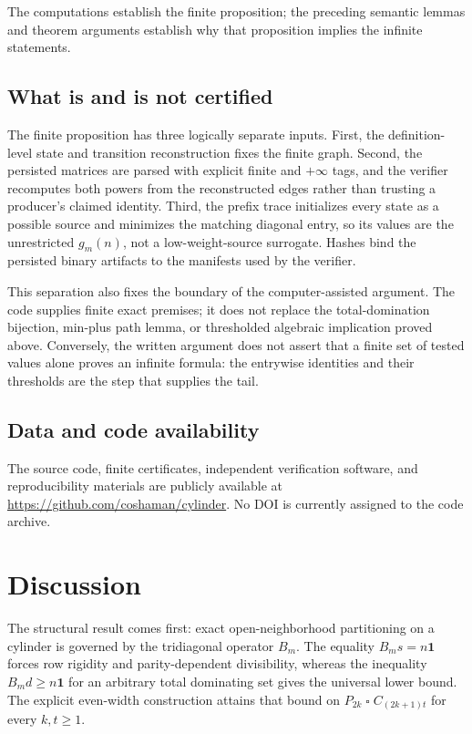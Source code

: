 \documentclass[11pt]{article}
\theoremstyle{definition}
\newcommand{\sq}{\mathbin{\square}}
\begin{document}
The computations establish the finite proposition; the preceding semantic
lemmas and theorem arguments establish why that proposition implies the
infinite statements.

\subsection{What is and is not certified}

The finite proposition has three logically separate inputs. First, the
definition-level state and transition reconstruction fixes the finite graph.
Second, the persisted matrices are parsed with explicit finite and
\(+\infty\) tags, and the verifier recomputes both powers from the reconstructed
edges rather than trusting a producer's claimed identity. Third, the prefix
trace initializes every state as a possible source and minimizes the matching
diagonal entry, so its values are the unrestricted \(g_m(n)\), not a
low-weight-source surrogate. Hashes bind the persisted binary artifacts to
the manifests used by the verifier.

This separation also fixes the boundary of the computer-assisted argument.
The code supplies finite exact premises; it does not replace the
total-domination bijection, min-plus path lemma, or thresholded algebraic
implication proved above. Conversely, the written argument does not assert
that a finite set of tested values alone proves an infinite formula: the
entrywise identities and their thresholds are the step that supplies the
tail.

\subsection{Data and code availability}
The source code, finite certificates, independent verification software, and
reproducibility materials are publicly available at
\url{https://github.com/coshaman/cylinder}. No DOI is currently assigned to
the code archive.

\section{Discussion}

The structural result comes first: exact open-neighborhood partitioning on a
cylinder is governed by the tridiagonal operator \(B_m\). The equality
\(B_ms=n\mathbf1\) forces row rigidity and parity-dependent divisibility,
whereas the inequality \(B_md\ge n\mathbf1\) for an arbitrary total
dominating set gives the universal lower bound. The explicit even-width
construction attains that bound on \(P_{2k}\sq C_{(2k+1)t}\) for every
\(k,t\ge1\).
\end{document}
